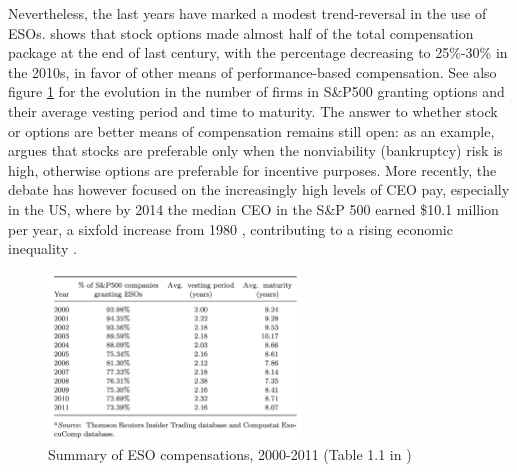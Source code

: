 Nevertheless, the last years have marked a modest trend-reversal in the use of ESOs. \cite{frydman2010ceo} shows that stock options made almost half of the total compensation package at the end of last century, with the percentage decreasing to 25\%-30\% in the 2010s, in favor of other means of performance-based compensation. See also figure \ref{fig:leung_tab_1-1} for the evolution in the number of firms in S\&P500 granting options and their average vesting period and time to maturity. The answer to whether stock or options are better means of compensation remains still open: as an example, \cite{kadan2008stocks} argues that stocks are preferable only when the nonviability (bankruptcy) risk is high, otherwise options are preferable for incentive purposes. 
More recently, the debate has however focused on the increasingly high levels of CEO pay, especially in the US, where by 2014 the median CEO in the S\&P 500 earned \$10.1 million per year, a sixfold increase from 1980 \cite{edmans2017executive}, contributing to a rising economic inequality \cite{mishel2012ceo}.

\vspace*{15pt}
\begin{figure}[H]
    \centering
    \includegraphics[width=0.6\textwidth]{fig/2/Leung_tab1-1.png}
    \caption{Summary of ESO compensations, 2000-2011 (Table 1.1 in \cite{leung2021employee})}
    \label{fig:leung_tab_1-1}
\end{figure}
\vspace*{15pt}


